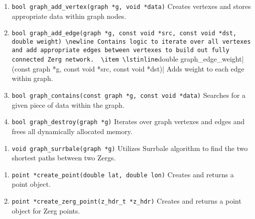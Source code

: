 \documentclass[12pt]{article}
\begin{document}
{{{\begin{enumerate}
\item \lstinline|bool graph_add_vertex(graph *g, void *data)|
\newline
Creates vertexes and stores appropriate data within graph nodes.

\item \lstinline|bool graph_add_edge(graph *g, const void *src, const void *dst, double weight)
\newline
Contains logic to iterate over all vertexes and add appropriate edges between vertexes to build out fully connected Zerg network.

\item \lstinline|double graph_edge_weight|(const graph *g, const void *src, const void *dst)|
\newline
Adds weight to each edge within graph.

\item \lstinline|bool graph_contains(const graph *g, const void *data)|
\newline
Searches for a given piece of data within the graph.

\item \lstinline|bool graph_destroy(graph *g)|
\newline
Iterates over graph vertexes and edges and frees all dynamically allocated memory.
\end{enumerate}
\hspace{8pt}
\begin{enumerate}
\subsection{pathfinding.c}

\item \lstinline|void graph_surrbale(graph *g)|
\newline
Utilizes Surrbale algorithm to find the two shortest paths between two Zergs.
\end{enumerate}
\hspace{8pt}
\begin{enumerate}
\subsection{quadTree.c}

\item \lstinline|point *create_point(double lat, double lon)|
\newline
Creates and returns a point object.

\item \lstinline|point *create_zerg_point(z_hdr_t *z_hdr)|
\newline
Creates and returns a point object for Zerg points.


\end{enumerate}}}}
\end{document}
